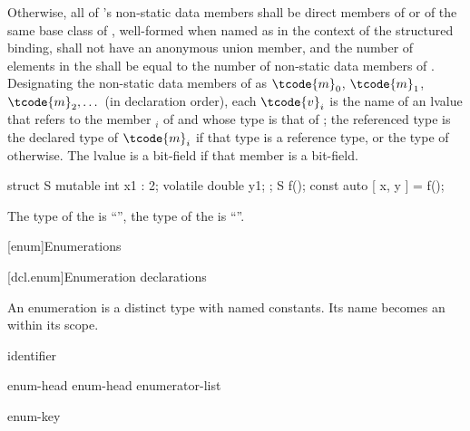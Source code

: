\pnum
Otherwise,
all of 's non-static data members
shall be direct members of  or
of the same base class of ,
well-formed when named as 
in the context of the structured binding,
 shall not have an anonymous union member, and
the number of elements in the  shall be
equal to the number of non-static data members of .
Designating the non-static data members of  as
$\tcode{m}_0$, $\tcode{m}_1$, $\tcode{m}_2, \dotsc$
(in declaration order),
each $\tcode{v}_i$ is the
name of an lvalue that refers to the member $_i$ of  and
whose type is
that of ;
the referenced type is
the declared type of $\tcode{m}_i$ if that type is a reference type, or
the type of  otherwise.
The lvalue is a
bit-field if that member is a bit-field.
\begin{example}
\begin{codeblock}
struct S { mutable int x1 : 2; volatile double y1; };
S f();
const auto [ x, y ] = f();
\end{codeblock}
The type of the   is ``'',
the type of the   is ``''.
\end{example}

[enum]{Enumerations}%

[dcl.enum]{Enumeration declarations}%
%
%

\pnum
An enumeration is a distinct type with named
constants. Its name becomes an  within its scope.

\begin{bnf}
\br
    identifier
\end{bnf}

\begin{bnf}
\br
    enum-head \terminal{\{}  \terminal{\}}\br
    enum-head \terminal{\{} enumerator-list \terminal{,} \terminal{\}}
\end{bnf}

\begin{bnf}
\br
    enum-key   
\end{bnf}

